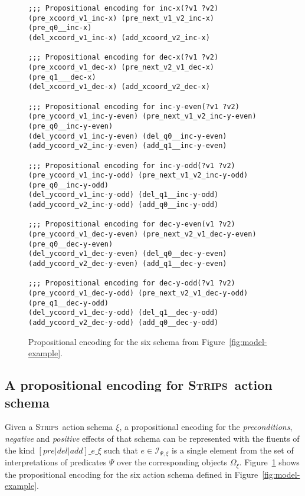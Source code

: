 \documentclass[letterpaper]{article} %
\newcommand{\strips}{\textsc{Strips}}     %
\begin{document}
\begin{figure}
\begin{tiny}
\begin{verbatim}
;;; Propositional encoding for inc-x(?v1 ?v2)
(pre_xcoord_v1_inc-x) (pre_next_v1_v2_inc-x) 
(pre_q0__inc-x)
(del_xcoord_v1_inc-x) (add_xcoord_v2_inc-x)

;;; Propositional encoding for dec-x(?v1 ?v2)
(pre_xcoord_v1_dec-x) (pre_next_v2_v1_dec-x) 
(pre_q1___dec-x)
(del_xcoord_v1_dec-x) (add_xcoord_v2_dec-x)

;;; Propositional encoding for inc-y-even(?v1 ?v2)
(pre_ycoord_v1_inc-y-even) (pre_next_v1_v2_inc-y-even)
(pre_q0__inc-y-even)
(del_ycoord_v1_inc-y-even) (del_q0__inc-y-even)
(add_ycoord_v2_inc-y-even) (add_q1__inc-y-even)

;;; Propositional encoding for inc-y-odd(?v1 ?v2)
(pre_ycoord_v1_inc-y-odd) (pre_next_v1_v2_inc-y-odd) 
(pre_q0__inc-y-odd)
(del_ycoord_v1_inc-y-odd) (del_q1__inc-y-odd)
(add_ycoord_v2_inc-y-odd) (add_q0__inc-y-odd)

;;; Propositional encoding for dec-y-even(v1 ?v2)
(pre_ycoord_v1_dec-y-even) (pre_next_v2_v1_dec-y-even)
(pre_q0__dec-y-even)
(del_ycoord_v1_dec-y-even) (del_q0__dec-y-even)
(add_ycoord_v2_dec-y-even) (add_q1__dec-y-even)

;;; Propositional encoding for dec-y-odd(?v1 ?v2)
(pre_ycoord_v1_dec-y-odd) (pre_next_v2_v1_dec-y-odd)
(pre_q1__dec-y-odd)
(del_ycoord_v1_dec-y-odd) (del_q1__dec-y-odd)
(add_ycoord_v2_dec-y-odd) (add_q0__dec-y-odd)
\end{verbatim}
\end{tiny}
 \caption{\small Propositional encoding for the six schema from Figure~\ref{fig:model-example}.}
\label{fig:encoding}
\end{figure}

\subsection{A propositional encoding for \strips\ action schema}
Given a \strips\ action schema $\xi$, a propositional encoding for the {\em preconditions}, {\em negative} and {\em positive} effects of that schema can be represented with the fluents of the kind $[pre|del|add]\_e\_\xi$ such that $e\in{\mathcal I}_{\Psi,\xi}$ is a single element from the set of interpretations of predicates $\Psi$ over the corresponding objects $\Omega_\xi$. Figure~\ref{fig:encoding} shows the propositional encoding for the six action schema defined in Figure~\ref{fig:model-example}.
\end{document}
